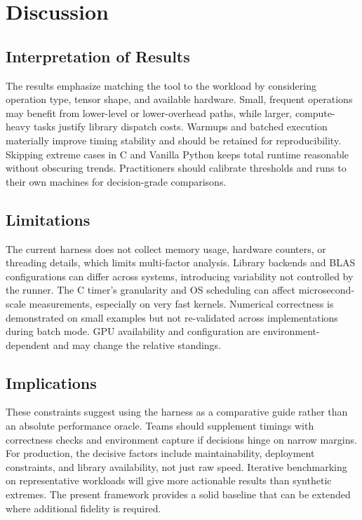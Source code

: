 \documentclass[a4paper,12pt]{article}
\begin{document}
\section{Discussion}
\subsection{Interpretation of Results}
The results emphasize matching the tool to the workload by considering operation type, tensor shape, and available hardware. Small, frequent operations may benefit from lower-level or lower-overhead paths, while larger, compute-heavy tasks justify library dispatch costs. Warmups and batched execution materially improve timing stability and should be retained for reproducibility. Skipping extreme cases in C and Vanilla Python keeps total runtime reasonable without obscuring trends. Practitioners should calibrate thresholds and runs to their own machines for decision-grade comparisons.

\subsection{Limitations}
The current harness does not collect memory usage, hardware counters, or threading details, which limits multi-factor analysis. Library backends and BLAS configurations can differ across systems, introducing variability not controlled by the runner. The C timer’s granularity and OS scheduling can affect microsecond-scale measurements, especially on very fast kernels. Numerical correctness is demonstrated on small examples but not re-validated across implementations during batch mode. GPU availability and configuration are environment-dependent and may change the relative standings.

\subsection{Implications}
These constraints suggest using the harness as a comparative guide rather than an absolute performance oracle. Teams should supplement timings with correctness checks and environment capture if decisions hinge on narrow margins. For production, the decisive factors include maintainability, deployment constraints, and library availability, not just raw speed. Iterative benchmarking on representative workloads will give more actionable results than synthetic extremes. The present framework provides a solid baseline that can be extended where additional fidelity is required.
\end{document}
